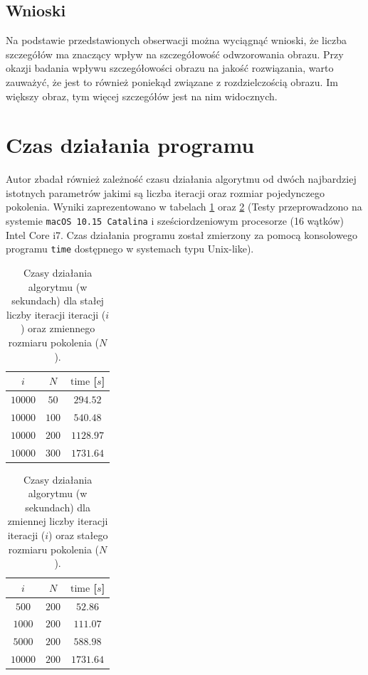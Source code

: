 \subsection{Wnioski}
Na podstawie przedstawionych obserwacji można wyciągnąć wnioski, że liczba szczegółów ma znaczący wpływ na szczegółowość odwzorowania obrazu. Przy okazji badania wpływu szczegółowości obrazu na jakość rozwiązania, warto zauważyć, że jest to również poniekąd związane z rozdzielczością obrazu. Im większy obraz, tym więcej szczegółów jest na nim widocznych.

\section{Czas działania programu}
Autor zbadał również zależność czasu działania algorytmu od dwóch najbardziej istotnych parametrów jakimi są liczba iteracji oraz rozmiar pojedynczego pokolenia. Wyniki zaprezentowano w tabelach \ref{tab:times_it} oraz \ref{tab:times_gen} (Testy przeprowadzono na systemie \texttt{macOS 10.15 Catalina} i sześciordzeniowym procesorze (16 wątków) Intel Core i7. Czas działania programu został zmierzony za pomocą konsolowego programu \texttt{time} dostępnego w systemach typu Unix-like).

\begin{table}[!htb]
    \centering
    \begin{tabular}{|c|c|c|}
        \hline
        $i$ & $N$ & $\mathrm{time}$ [$s$]  \\
        \hline
        $10000$ & $50$ & $294.52$ \\
        \hline
        $10000$ & $100$ & $540.48$ \\
        \hline
        $10000$ & $200$ & $1128.97$ \\
        \hline
        $10000$ & $300$ & $1731.64$ \\
        \hline
    \end{tabular}
    \caption{Czasy działania algorytmu (w sekundach) dla stałej liczby iteracji iteracji ($i$) oraz zmiennego rozmiaru pokolenia ($N$).}
    \label{tab:times_it}
\end{table}

\begin{table}[!htb]
    \centering
    \begin{tabular}{|c|c|c|}
        \hline
        $i$ & $N$ & $\mathrm{time}$ [$s$]  \\
        \hline
        $500$ & $200$ & $52.86$ \\
        \hline
        $1000$ & $200$ & $111.07$ \\
        \hline
        $5000$ & $200$ & $588.98$ \\
        \hline
        $10000$ & $200$ & $1731.64$ \\
        \hline
    \end{tabular}
    \caption{Czasy działania algorytmu (w sekundach) dla zmiennej liczby iteracji iteracji ($i$) oraz stałego rozmiaru pokolenia ($N$).}
    \label{tab:times_gen}
\end{table}

